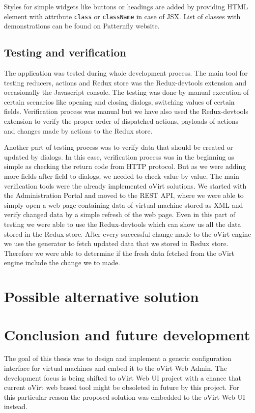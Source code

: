 Styles for simple widgets like buttons or headings are added by providing HTML element with attribute \texttt{class} or \texttt{className} in case of JSX. List of classes with demonstrations can be found on Patternfly website\cite{Patternfly}. 

\newpage
\section{Testing and verification}
The application was tested during whole development process. The main tool for testing reducers, actions and Redux store was the Redux-devtools extension and occasionally the Javascript console. The testing was done by manual execution of certain scenarios like opening and closing dialogs, switching values of certain fields. Verification process was manual but we have also used the Redux-devtools extension to verify the proper order of dispatched actions, payloads of actions and changes made by actions to the Redux store.

Another part of testing process was to verify data that should be created or updated by dialogs. In this case, verification process was in the beginning as simple as checking the return code from HTTP protocol. But as we were adding more fields after field to dialogs, we needed to check value by value. The main verification tools were the already implemented oVirt solutions. We started with the Administration Portal and moved  to the REST API, where we were able to simply open a web page containing data of virtual machine stored as XML and verify changed data by a simple refresh of the web page. Even in this part of testing we were able to use the Redux-devtools which can show us all the data stored in the Redux store. After every successful change made to the oVirt engine we use the generator to fetch updated data that we stored in Redux store. Therefore we were able to determine if the fresh data fetched from the oVirt engine include the change we to made.


\chapter{Possible alternative solution}

\chapter{Conclusion and future development}
The goal of this thesis was to design and implement a generic configuration interface for virtual machines and embed it to the oVirt Web Admin. The development focus is being shifted to oVirt Web UI project with a chance that current oVirt web based tool might be obsoleted in future by this project. For this particular reason the proposed solution was embedded to the oVirt Web UI instead.

